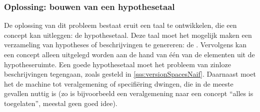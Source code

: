 \subsubsection{Oplossing: bouwen van een hypothesetaal}
De oplossing van dit probleem bestaat eruit een taal te ontwikkelen, die een concept kan uitleggen: de hypothesetaal. Deze taal moet het mogelijk maken een verzameling van hypotheses of beschrijvingen te genereren: de . Vervolgens kan een concept alleen uitgelegd worden aan de hand van \'e\'en van de elementen uit de hypotheseruimte. Een goede hypothesetaal moet het probleem van zinloze beschrijvingen tegengaan, zoals gesteld in \ref{sss:versionSpacesNaif}. Daarnaast moet het de machine tot veralgemening of specifi\"ering dwingen, die in de meeste gevallen nuttig is (zo is bijvoorbeeld een veralgemening naar een concept ``alles is toegelaten'', meestal geen goed idee).
